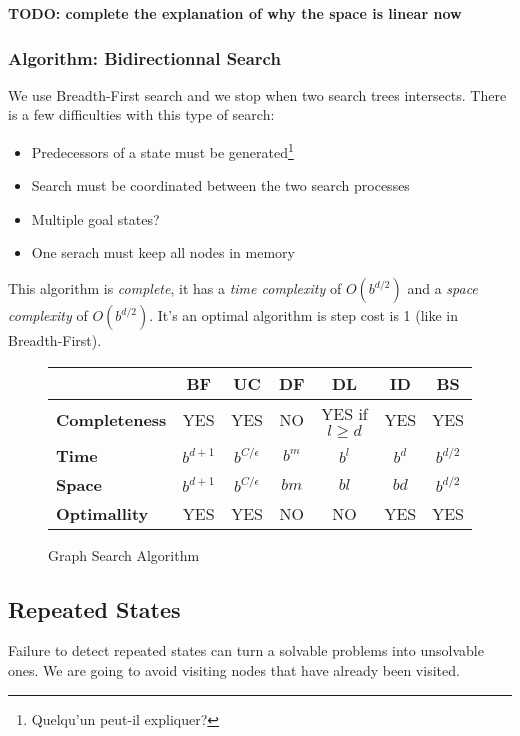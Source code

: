 \textbf{TODO: complete the explanation of why the space is linear now}

\subsubsection{Algorithm: Bidirectionnal Search}

We use Breadth-First search and we stop when two search trees intersects. There is a few difficulties with this type of search:
\begin{itemize}
\item Predecessors of a state must be generated\footnote{Quelqu'un peut-il expliquer?}
\item Search must be coordinated between the two search processes
\item Multiple goal states?
\item One serach must keep all nodes in memory
\end{itemize} 

This algorithm is \textit{complete}, it has a \textit{time complexity} of $O(b^{d/2})$ and a \textit{space complexity} of $O(b^{d/2})$. It's an optimal algorithm is step cost is 1 (like in Breadth-First). 

\begin{figure}[h]
\centering
\begin{tabular}{|l|cccccc|}
\hline
& \textbf{BF} & \textbf{UC} & \textbf{DF} & \textbf{DL} & \textbf{ID} & \textbf {BS}\\
\hline
\textbf{Completeness} & YES & YES & NO & YES if $l\geq d$ & YES & YES\\
\textbf{Time} & $b^{d+1}$ & $b^{C/\epsilon}$ & $b^m$ & $b^l$ & $b^d$ & $b^{d/2}$\\
\textbf{Space} & $b^{d+1}$ & $b^{C/\epsilon}$ & $bm$ & $bl$ & $bd$ & $b^{d/2}$ \\
\textbf{Optimallity} & YES & YES & NO & NO & YES & YES \\
\hline
\end{tabular}
\caption{Graph Search Algorithm}
\end{figure}

\subsection{Repeated States}

Failure to detect repeated states can turn a solvable problems into unsolvable ones. We are going to avoid visiting nodes that have already been visited. 

